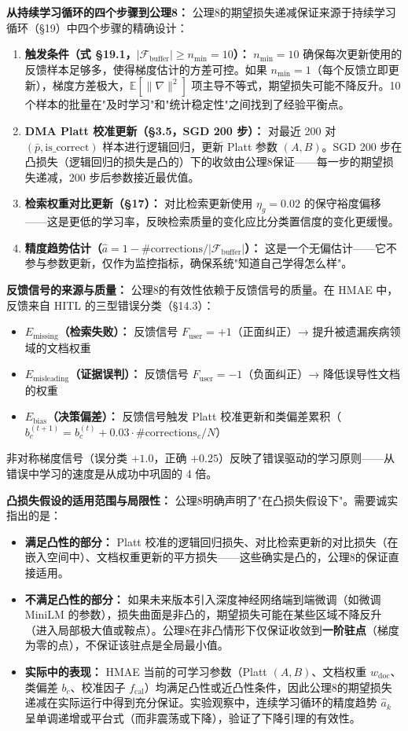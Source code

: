 \documentclass[11pt,a4paper]{ctexart}
\theoremstyle{remark}
\begin{document}
\textbf{从持续学习循环的四个步骤到公理8：} 公理8的期望损失递减保证来源于持续学习循环（§19）中四个步骤的精确设计：
\begin{enumerate}[nosep]
\item \textbf{触发条件（式 §19.1，$|\mathcal{F}_{\text{buffer}}| \geq n_{\min} = 10$）：} $n_{\min}=10$ 确保每次更新使用的反馈样本足够多，使得梯度估计的方差可控。如果 $n_{\min}=1$（每个反馈立即更新），梯度方差极大，$\mathbb{E}[\|\nabla\|^2]$ 项主导不等式，期望损失可能不降反升。10 个样本的批量在"及时学习"和"统计稳定性"之间找到了经验平衡点。
\item \textbf{DMA Platt 校准更新（§3.5，SGD 200 步）：} 对最近 200 对 $(\bar{p}, \text{is\_correct})$ 样本进行逻辑回归，更新 Platt 参数 $(A, B)$。SGD 200 步在凸损失（逻辑回归的损失是凸的）下的收敛由公理8保证——每一步的期望损失递减，200 步后参数接近最优值。
\item \textbf{检索权重对比更新（§17）：} 对比检索更新使用 $\eta_g = 0.02$ 的保守裕度偏移——这是更低的学习率，反映检索质量的变化应比分类置信度的变化更缓慢。
\item \textbf{精度趋势估计（$\hat{a} = 1 - \#\text{corrections} / |\mathcal{F}_{\text{buffer}}|$）：} 这是一个无偏估计——它不参与参数更新，仅作为监控指标，确保系统"知道自己学得怎么样"。
\end{enumerate}

\textbf{反馈信号的来源与质量：} 公理8的有效性依赖于反馈信号的质量。在 HMAE 中，反馈来自 HITL 的三型错误分类（§14.3）：
\begin{itemize}[nosep]
\item \textbf{$E_{\text{missing}}$（检索失败）：} 反馈信号 $F_{\text{user}} = +1$（正面纠正）→ 提升被遗漏疾病领域的文档权重
\item \textbf{$E_{\text{misleading}}$（证据误判）：} 反馈信号 $F_{\text{user}} = -1$（负面纠正）→ 降低误导性文档的权重
\item \textbf{$E_{\text{bias}}$（决策偏差）：} 反馈信号触发 Platt 校准更新和类偏差累积（$b_c^{(t+1)} = b_c^{(t)} + 0.03 \cdot \#\text{corrections}_c / N$）
\end{itemize}
非对称梯度信号（误分类 $+1.0$，正确 $+0.25$）反映了错误驱动的学习原则——从错误中学习的速度是从成功中巩固的 4 倍。

\textbf{凸损失假设的适用范围与局限性：} 公理8明确声明了"在凸损失假设下"。需要诚实指出的是：
\begin{itemize}[nosep]
\item \textbf{满足凸性的部分：} Platt 校准的逻辑回归损失、对比检索更新的对比损失（在嵌入空间中）、文档权重更新的平方损失——这些确实是凸的，公理8的保证直接适用。
\item \textbf{不满足凸性的部分：} 如果未来版本引入深度神经网络端到端微调（如微调 MiniLM 的参数），损失曲面是非凸的，期望损失可能在某些区域不降反升（进入局部极大值或鞍点）。公理8在非凸情形下仅保证收敛到\textbf{一阶驻点}（梯度为零的点），不保证该驻点是全局最小值。
\item \textbf{实际中的表现：} HMAE 当前的可学习参数（Platt $(A,B)$、文档权重 $w_{\text{doc}}$、类偏差 $b_c$、校准因子 $f_{\text{cal}}$）均满足凸性或近凸性条件，因此公理8的期望损失递减在实际运行中得到充分保证。实验观察中，连续学习循环的精度趋势 $\hat{a}_k$ 呈单调递增或平台式（而非震荡或下降），验证了下降引理的有效性。
\end{itemize}
\end{document}
